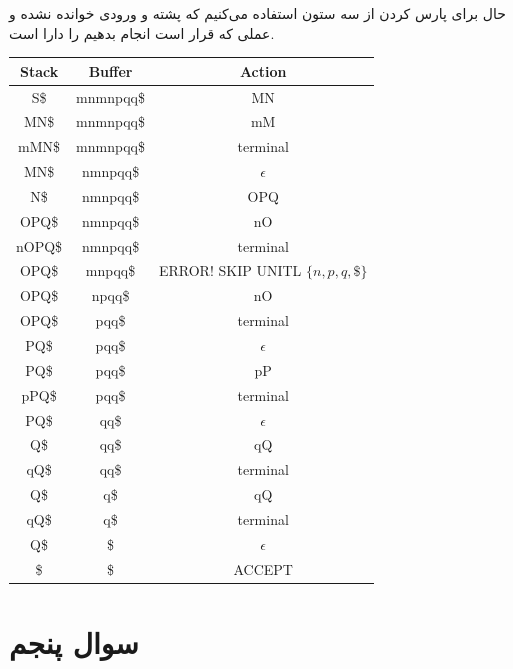 \documentclass[]{article}
\begin{document}
حال برای پارس کردن از سه ستون استفاده می‌کنیم که پشته و ورودی خوانده نشده و عملی که قرار است انجام بدهیم
را دارا است.
\begin{latin}
    \centering
    \begin{tabular}{c|c|c}
        \textbf{Stack} & \textbf{Buffer} & \textbf{Action}\\
        \hline
        S\$ & mnmnpqq\$ & MN\\
        MN\$ & mnmnpqq\$ & mM\\
        mMN\$ & mnmnpqq\$ & terminal\\
        MN\$ & nmnpqq\$ & $\epsilon$\\
        N\$ & nmnpqq\$ & OPQ\\
        OPQ\$ & nmnpqq\$ & nO\\
        nOPQ\$ & nmnpqq\$ & terminal\\
        OPQ\$ & mnpqq\$ & ERROR! SKIP UNITL $\{n, p, q, \$\}$\\
        OPQ\$ & npqq\$ & nO\\
        OPQ\$ & pqq\$ & terminal\\
        PQ\$ & pqq\$ & $\epsilon$\\
        PQ\$ & pqq\$ & pP\\
        pPQ\$ & pqq\$ & terminal\\
        PQ\$ & qq\$ & $\epsilon$\\
        Q\$ & qq\$ & qQ\\
        qQ\$ & qq\$ & terminal\\
        Q\$ & q\$ & qQ\\
        qQ\$ & q\$ & terminal\\
        Q\$ & \$ & $\epsilon$\\
        \$ & \$ & ACCEPT\\
    \end{tabular}
\end{latin}
\section*{سوال پنجم}
\end{document}
